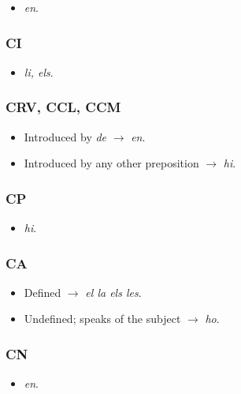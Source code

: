 \documentclass{article}
\begin{document}
\begin{itemize}
    \item \emph{en}.
\end{itemize}

\subsubsection*{CI}

\begin{itemize}
    \item \emph{li, els}.
\end{itemize}

\subsubsection*{CRV, CCL, CCM}

\begin{itemize}
    \item Introduced by \emph{de} $\rightarrow$ \emph{en}.
    \item Introduced by any other preposition $\rightarrow$ \emph{hi}.
\end{itemize}

\subsubsection*{CP}

\begin{itemize}
    \item \emph{hi}.
\end{itemize}

\subsubsection*{CA}

\begin{itemize}
    \item Defined $\rightarrow$ \emph{el la els les}.
    \item Undefined; speaks of the subject $\rightarrow$ \emph{ho}.
\end{itemize}

\subsubsection*{CN}

\begin{itemize}
    \item \emph{en}.
\end{itemize}
\end{document}
